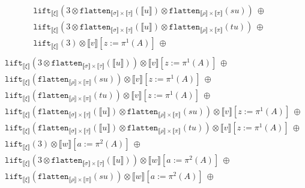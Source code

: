 \documentclass[a4paper,UKenglish,cleveref,autoref,numberwithinsect]{lipics-v2019}
\theoremstyle{definition}
\newcommand{\flatten}{\mathtt{flatten}}
\newcommand{\lift}{\mathtt{lift}}
\newcommand{\typeinterpret}[1]{\llbracket #1 \rrbracket}
\newcommand{\interpret}[1]{\llbracket #1 \rrbracket}
\begin{document}
\begin{itemize}
\[\begin{array}{l}
  \phantom{A}
    \lift_{\typeinterpret{\xi}}(3 \otimes \flatten_{\typeinterpret{\sigma}
    \times \typeinterpret{\tau}}(\interpret{u}) \otimes
    \flatten_{\typeinterpret{\rho} \times \typeinterpret{\pi}}(su))\
    \oplus \\
  \phantom{A}
    \lift_{\typeinterpret{\xi}}(3 \otimes \flatten_{\typeinterpret{\sigma}
    \times \typeinterpret{\tau}}(\interpret{u}) \otimes
    \flatten_{\typeinterpret{\rho} \times \typeinterpret{\pi}}(tu))\
    \oplus \\
  \phantom{A}
    \lift_{\typeinterpret{\xi}}(3) \otimes \interpret{v}[z:=\pi^1(A)]
    \ \oplus \\
  \end{array}
  \]
  \[
  \begin{array}{l}
  \phantom{A}
    \lift_{\typeinterpret{\xi}}(3 \otimes
    \flatten_{\typeinterpret{\sigma} \times \typeinterpret{\tau}}(
    \interpret{u})) \otimes
     \interpret{v}[z:=\pi^1(A)]
    \ \oplus \\
  \phantom{A}
    \lift_{\typeinterpret{\xi}}(\flatten_{\typeinterpret{\rho} \times
    \typeinterpret{\pi}}(su)) \otimes
     \interpret{v}[z:=\pi^1(A)]
    \ \oplus\\
  \phantom{A}
    \lift_{\typeinterpret{\xi}}(\flatten_{\typeinterpret{\rho} \times
    \typeinterpret{\pi}}(tu)) \otimes
     \interpret{v}[z:=\pi^1(A)]
    \ \oplus \\
  \phantom{A}
    \lift_{\typeinterpret{\xi}}(\flatten_{\typeinterpret{\sigma} \times
    \typeinterpret{\tau}}(\interpret{u}) \otimes
    \flatten_{\typeinterpret{\rho} \times \typeinterpret{\pi}}(su))
    \otimes
     \interpret{v}[z:=\pi^1(A)]
    \ \oplus \\
  \phantom{A}
    \lift_{\typeinterpret{\xi}}(\flatten_{\typeinterpret{\sigma} \times
    \typeinterpret{\tau}}(\interpret{u}) \otimes
    \flatten_{\typeinterpret{\rho} \times \typeinterpret{\pi}}(tu))
    \otimes
     \interpret{v}[z:=\pi^1(A)]
    \ \oplus \\
  \phantom{A}
    \lift_{\typeinterpret{\xi}}(3) \otimes \interpret{w}[a:=\pi^2(A)]
    \ \oplus \\
  \phantom{A}
    \lift_{\typeinterpret{\xi}}(3 \otimes
    \flatten_{\typeinterpret{\sigma} \times \typeinterpret{\tau}}(
    \interpret{u})) \otimes
    \interpret{w}[a:=\pi^2(A)]
    \ \oplus \\
  \phantom{A}
    \lift_{\typeinterpret{\xi}}(\flatten_{\typeinterpret{\rho} \times
    \typeinterpret{\pi}}(su)) \otimes
    \interpret{w}[a:=\pi^2(A)]
    \ \oplus\\

\end{array}\]
\end{itemize}
\end{document}
